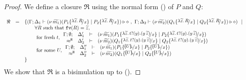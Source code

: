 \begin{proof}
	\noi We define a closure $\Re$ using the normal form () of $P$ and $Q$:

	\[
		\begin{array}{rcll}
			\Re &=& \set{
			(\Gamma; \Delta_1 \proves \newsp{\widetilde{m_1}}{P_1 \subst{\abs{\widetilde{z}}{R}}{x} \Par P_2 \subst{\abs{\widetilde{z}}{R}}{x}} \hastype \Proc
			\ ,\ 
			\Gamma; \Delta_2 \proves \newsp{\widetilde{m_2}}{Q_1 \subst{\abs{\widetilde{z}}{R}}{x} \Par Q_2 \subst{\abs{\widetilde{z}}{R}}{x}} \hastype \Proc)
			\setbar \\
			&& \qquad \forall R \textrm{ such that } \fv{R} = \widetilde{z},\\
			&& \qquad \textrm{ for fresh } t,
			\mhorel{\Gamma}{\Delta_1'}
			{\newsp{\widetilde{m_1}}{P_1 \subst{\auxtr{t}}{x} \Par P_2 \subst{\auxtr{t}}{x}}}
			{\hwb}
			{\Delta_2'}{}{\newsp{\widetilde{m_2}}{Q_1 \subst{\auxtr{t}}{x} \Par Q_2 \subst{\auxtr{t}}{x}}}\\
			&& \qquad \textrm{ for some } U, 
			\mhorel{\Gamma}{\Delta_1''}
			{\newsp{\widetilde{m_1}}{P_1 \subst{\omapchar{U}}{x} \Par P_2 \subst{\omapchar{U}}{x}}}
			{\hwb}
			{\Delta_2''}{}{\newsp{\widetilde{m_2}}{Q_1 \subst{\omapchar{U}}{x} \Par Q_2 \subst{\omapchar{U}}{x}}} \\
			&&}
		\end{array}
	\]
%
%
	\noi We show that $\Re$ is a bisimulation up to \betatran ().


\end{proof}

